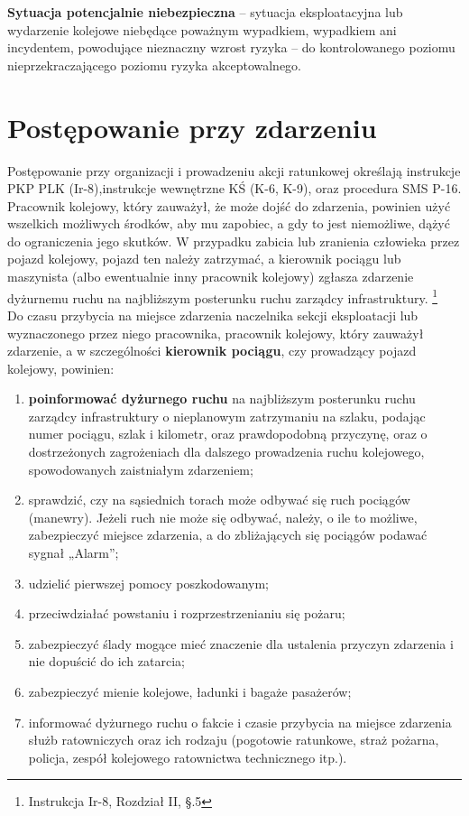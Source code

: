 \textbf{Sytuacja potencjalnie niebezpieczna} – sytuacja eksploatacyjna lub wydarzenie kolejowe niebędące poważnym wypadkiem, wypadkiem ani incydentem, powodujące nieznaczny wzrost ryzyka – do kontrolowanego poziomu nieprzekraczającego poziomu ryzyka akceptowalnego.

\section{Postępowanie przy zdarzeniu}
Postępowanie przy organizacji i prowadzeniu akcji ratunkowej określają instrukcje PKP PLK (Ir-8),instrukcje wewnętrzne KŚ (K-6, K-9), oraz procedura SMS P-16.
\\Pracownik kolejowy, który zauważył, że może dojść do zdarzenia, powinien użyć wszelkich możliwych środków, aby mu zapobiec, a gdy to jest niemożliwe, dążyć do ograniczenia jego skutków. 
W przypadku zabicia lub zranienia człowieka przez pojazd kolejowy, pojazd ten należy zatrzymać, a kierownik pociągu lub maszynista (albo ewentualnie inny pracownik kolejowy) zgłasza zdarzenie dyżurnemu ruchu na najbliższym posterunku ruchu zarządcy infrastruktury.
\footnote{Instrukcja Ir-8, Rozdział II, \S.5}
\\Do czasu przybycia na miejsce zdarzenia naczelnika sekcji eksploatacji lub wyznaczonego przez niego pracownika, pracownik kolejowy, który zauważył zdarzenie, a w szczególności \textbf{kierownik pociągu}, czy prowadzący pojazd kolejowy, powinien:
\begin{enumerate}
	\item \textbf{poinformować dyżurnego ruchu} na najbliższym posterunku ruchu zarządcy infrastruktury o nieplanowym zatrzymaniu na szlaku, podając numer pociągu, szlak i kilometr, oraz prawdopodobną przyczynę, oraz o dostrzeżonych zagrożeniach dla dalszego prowadzenia ruchu kolejowego, spowodowanych zaistniałym zdarzeniem;
	\item sprawdzić, czy na sąsiednich torach może odbywać się ruch pociągów (manewry).
	Jeżeli ruch nie może się odbywać, należy, o ile to możliwe, zabezpieczyć miejsce zdarzenia, a do zbliżających się pociągów podawać sygnał „Alarm”;
	\item udzielić pierwszej pomocy poszkodowanym;
	\item przeciwdziałać powstaniu i rozprzestrzenianiu się pożaru;
	\item zabezpieczyć ślady mogące mieć znaczenie dla ustalenia przyczyn zdarzenia i nie dopuścić do ich zatarcia;
	\item zabezpieczyć mienie kolejowe, ładunki i bagaże pasażerów;
	\item informować dyżurnego ruchu o fakcie i czasie przybycia na miejsce zdarzenia służb	ratowniczych oraz ich rodzaju (pogotowie ratunkowe, straż pożarna, policja, zespół kolejowego ratownictwa technicznego itp.).
\end{enumerate}

